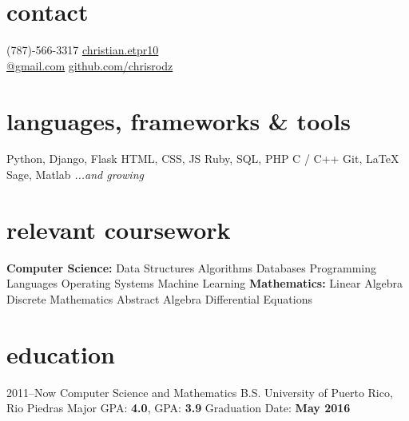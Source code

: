 \documentclass[]{friggeri-cv}
\begin{document}


\begin{aside} %
\section{contact}
(787)-566-3317
\href{mailto:christian.etpr10@gmail.com}{christian.etpr10 \\ @gmail.com}
\href{http://github.com/chrisrodz}{github.com/chrisrodz}
\section{languages, frameworks \& tools}
Python, Django, Flask
HTML, CSS, JS
Ruby, SQL, PHP
C / C++
Git, LaTeX
Sage, Matlab
\emph{...and growing}
\section{relevant coursework}
\vspace{1em} \textbf{Computer Science:}
Data Structures
Algorithms
Databases
Programming Languages
Operating Systems
Machine Learning\vspace{1em}
\textbf{Mathematics:}
Linear Algebra
Discrete Mathematics
Abstract Algebra
Differential Equations
\end{aside}


\section{education}

\begin{entrylist}
\entry
{2011--Now}
{Computer Science and Mathematics B.S.}
{University of Puerto Rico, Rio Piedras}
{Major GPA: \textbf{4.0}, GPA: \textbf{3.9} Graduation Date: \textbf{May 2016}}
\end{entrylist}
\end{document}
